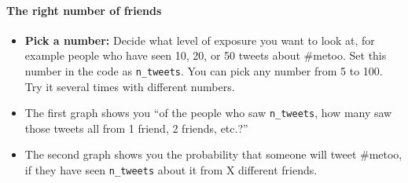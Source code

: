 \documentclass[11pt]{article}
\providecommand{\tightlist}{%
      \setlength{\itemsep}{0pt}\setlength{\parskip}{0pt}}
\begin{document}
    \hypertarget{the-right-number-of-friends}{%
\paragraph{The right number of
friends}\label{the-right-number-of-friends}}

\begin{itemize}
\tightlist
\item
  \textbf{Pick a number:} Decide what level of exposure you want to look
  at, for example people who have seen 10, 20, or 50 tweets about
  \#metoo. Set this number in the code as \texttt{n\_tweets}. You can
  pick any number from 5 to 100. Try it several times with different
  numbers.
\item
  The first graph shows you ``of the people who saw \texttt{n\_tweets},
  how many saw those tweets all from 1 friend, 2 friends, etc.?''
\item
  The second graph shows you the probability that someone will tweet
  \#metoo, if they have seen \texttt{n\_tweets} about it from X
  different friends.
\end{itemize}
\end{document}

